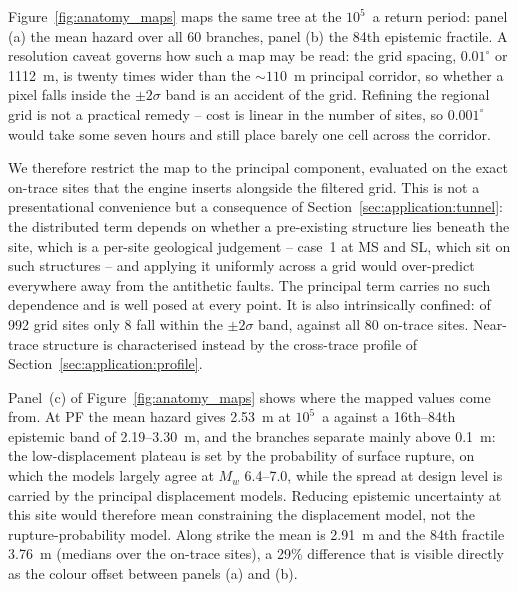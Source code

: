 Figure~\ref{fig:anatomy_maps} maps the same tree at the $10^{5}$~a
return period: panel (a) the mean hazard over all 60 branches, panel
(b) the 84th epistemic fractile. A resolution caveat governs how such a
map may be read: the grid spacing, $0.01^{\circ}$ or 1112~m, is twenty
times wider
than the ${\sim}110$~m principal corridor, so whether a pixel falls
inside the $\pm 2\sigma$ band is an accident of the grid. Refining the
regional grid is not a practical remedy -- cost is linear in the number
of sites, so $0.001^{\circ}$ would take some seven hours and still
place barely one cell across the corridor.

We therefore restrict the map to the principal component, evaluated on
the exact on-trace sites that the engine inserts alongside the filtered
grid. This is not a presentational convenience but a consequence of
Section~\ref{sec:application:tunnel}: the distributed term depends on
whether a pre-existing structure lies beneath the site, which is a
per-site geological judgement -- case~1 at MS and SL, which sit on such
structures -- and applying it uniformly across a grid would
over-predict everywhere away from the antithetic faults. The principal
term carries no such dependence and is well posed at every point. It is
also intrinsically confined: of 992 grid sites only 8 fall within the
$\pm 2\sigma$ band, against all 80 on-trace sites. Near-trace structure
is characterised instead by the cross-trace profile of
Section~\ref{sec:application:profile}.

Panel~(c) of Figure~\ref{fig:anatomy_maps} shows where the mapped
values come from. At PF the mean hazard gives 2.53~m at $10^{5}$~a
against a 16th--84th epistemic band of 2.19--3.30~m, and the branches
separate mainly above 0.1~m: the low-displacement plateau is set by the
probability of surface rupture, on which the models largely agree at
$M_w$ 6.4--7.0, while the spread at design level is carried by the
principal displacement models. Reducing epistemic uncertainty at this
site would therefore mean constraining the displacement model, not the
rupture-probability model. Along strike the mean is 2.91~m and the 84th
fractile 3.76~m (medians over the on-trace sites), a 29\% difference
that is visible directly as the colour offset between panels (a) and
(b).


